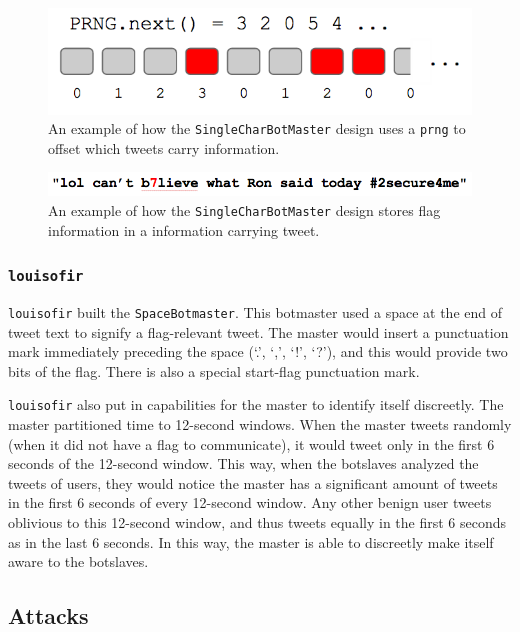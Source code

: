 \documentclass[11pt, oneside]{article} %
\numberwithin{equation}{section} %
\numberwithin{figure}{section} %
\numberwithin{table}{section} %
\renewcommand{\c}[1]{\texttt{#1}}
\newcommand{\teamol}{\c{louisofir}}
\begin{document}
		\begin{figure}[H]
		    \center\includegraphics[scale=0.70]{resources/prng.png}
		    \caption{An example of how the \c{SingleCharBotMaster} design uses a \c{prng} to offset which tweets carry information.}
		    \label{fig:prng}
		 \end{figure}

		 \begin{figure}[H]
		    \center\includegraphics[scale=0.60]{resources/prng-tweet-ex.png}
		    \caption{An example of how the \c{SingleCharBotMaster} design stores flag information in a information carrying tweet.}
		    \label{fig:prng-tweet-ex}
		 \end{figure}
		
			
		\subsubsection{\teamol{}}
			\teamol{} built the \c{SpaceBotmaster}. This botmaster used a space at the end of tweet text to signify a flag-relevant tweet. The master would insert a punctuation mark immediately preceding the space (`.', `,', `!', `?'), and this would provide two bits of the flag. There is also a special start-flag punctuation mark. 

			\teamol{} also put in capabilities for the master to identify itself discreetly. The master partitioned time to 12-second windows. When the master tweets randomly (when it did not have a flag to communicate), it would tweet only in the first 6 seconds of the 12-second window. This way, when the botslaves analyzed the tweets of users, they would notice the master has a significant amount of tweets in the first 6 seconds of every 12-second window. Any other benign user tweets oblivious to this 12-second window, and thus tweets equally in the first 6 seconds as in the last 6 seconds. In this way, the master is able to discreetly make itself aware to the botslaves.

	\subsection{Attacks}
\end{document}
